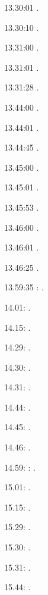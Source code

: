 \documentclass[italian]{article}
\begin{document}
13.30:01     .

13.30:10     .

13.31:00     .

13.31:01     .

13.31:28     .

13.44:00     .

13.44:01     .

13.44:45     .

13.45:00     .

13.45:01     .

13.45:53     .

13.46:00     .

13.46:01     .

13.46:25     .

13.59:35     
:    .

14.01:     . 

14.15:     . 

14.29:     . 

14.30:     .

14.31:     .

14.44:     .

14.45:     .

14.46:     .

14.59:     
:    .

15.01:     . 

15.15:     . 

15.29:     . 

15.30:     .

15.31:     .

15.44:     .
\end{document}
